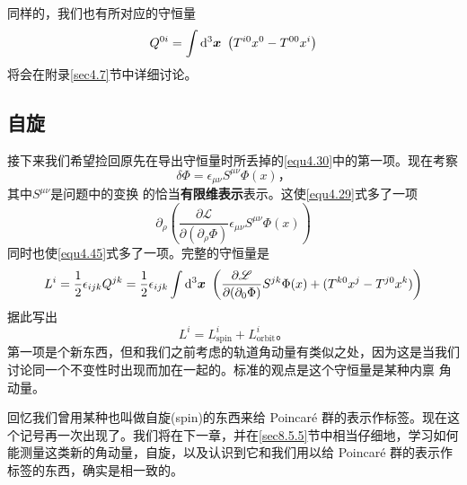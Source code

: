 同样的，我们也有所对应的守恒量
\begin{equation}
Q^{0i}=\int \mathrm d^3 \bm{x}~ \left(T^{i 0} x^0- T^{0 0}x^i\right)
\label{equ4.46}
\end{equation}
将会在附录\ref{sec4.7}节中详细讨论。

\subsection{自旋}\label{sec4.5.4}
接下来我们希望捡回原先在导出守恒量时所丢掉的\eqref{equ4.30}中的第一项。现在考察
\begin{equation}
\delta\Phi = \epsilon_{\mu\nu} S^{\mu\nu}\Phi(x) \text{，}
\end{equation}
其中$S^{\mu\nu}$是问题中的变换%
%
的恰当{\bf 有限维表示}表示。这使\eqref{equ4.29}式多了一项
\begin{equation}
\partial_\rho \left(\frac{\partial\mathscr L}{\partial (\partial_\rho \Phi)}\epsilon_{\mu\nu}S^{\mu\nu}\Phi(x)\right)
\end{equation}
同时也使\eqref{equ4.45}式多了一项。完整的守恒量是
\begin{equation}
L^i = \frac{1}{2}\epsilon_{ijk}Q^{jk} = \frac{1}{2}\epsilon_{ijk} \int \mathrm d^3 \bm{x}~ \left(\frac{\partial\mathscr L}{\partial (\partial_0 \Phi)}S^{jk}\Phi(x) + (T^{k 0} x^j-T^{j 0}x^k)\right)
\end{equation}
据此写出
\begin{equation}
L^i = L_\text{spin}^i + L_\text{orbit}^i \text{。}
\end{equation}
第一项是个新东西，但和我们之前考虑的轨道角动量有类似之处，因为这是当我们讨论同一个不变性时出现而加在一起的。标准的观点是这个守恒量是某种内禀%
%
角动量。

回忆我们曾用某种也叫做自旋(spin)的东西来给 Poincar\'e 群的表示作标签。现在这个记号再一次出现了。我们将在下一章，并在\ref{sec8.5.5}节中相当仔细地，学习如何能测量这类新的角动量，自旋，以及认识到它和我们用以给 Poincar\'e 群的表示作标签的东西，确实是相一致的。


